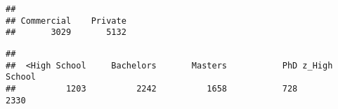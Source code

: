 \documentclass[
]{article}
\newenvironment{Shaded}{\begin{snugshade}}{\end{snugshade}}
\newcommand{\FunctionTok}[1]{\textcolor[rgb]{0.13,0.29,0.53}{\textbf{#1}}}
\newcommand{\NormalTok}[1]{#1}
\newcommand{\SpecialCharTok}[1]{\textcolor[rgb]{0.81,0.36,0.00}{\textbf{#1}}}
\begin{document}
\begin{verbatim}
## 
## Commercial    Private 
##       3029       5132
\end{verbatim}

\begin{Shaded}
\end{Shaded}

\begin{verbatim}
## 
##  <High School     Bachelors       Masters           PhD z_High School 
##          1203          2242          1658           728          2330
\end{verbatim}
\end{document}
